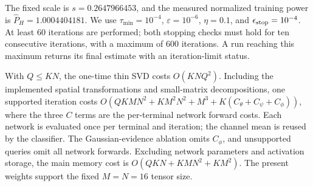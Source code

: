 \documentclass[10pt,a4paper]{article}
\begin{document}
The fixed scale is $s=0.2647966453$, and the measured normalized training
power is $\widehat P_H=1.0004404181$. We use $\tau_{\min}=10^{-4}$,
$\varepsilon=10^{-6}$, $\eta=0.1$, and
$\epsilon_{\rm stop}=10^{-4}$. At least 60 iterations are performed;
both stopping checks must hold for ten consecutive iterations, with a
maximum of 600 iterations. A run reaching this maximum returns its
final estimate with an iteration-limit status.

With $Q\leq KN$, the one-time thin SVD costs $O(KNQ^2)$. Including the
implemented spatial transformations and small-matrix decompositions, one
supported iteration costs
$O(QKMN^2+KM^2N^2+M^3+K(C_\theta+C_\psi+C_\phi))$,
where the three $C$ terms are the per-terminal network forward costs.
Each network is evaluated once per terminal and iteration; the channel
mean is reused by the classifier. The Gaussian-evidence ablation omits
$C_\phi$, and unsupported queries omit all network forwards.
Excluding network parameters and activation storage, the main memory cost
is $O(QKN+KMN^2+KM^2)$. The present weights support the fixed
$M=N=16$ tensor size.
\end{document}
